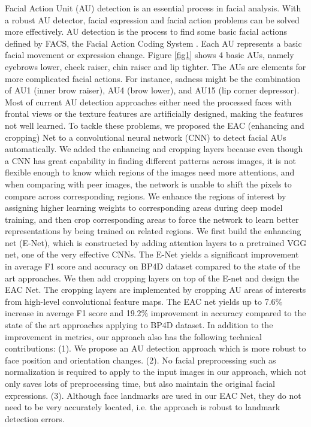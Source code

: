 \documentclass[a4paper, 10pt, conference]{ieeeconf}      %
\begin{document}
Facial Action Unit (AU) detection is an essential process in facial analysis. With a robust AU detector, facial expression and facial action problems can be solved more effectively. AU detection is the process to find some basic facial actions defined by FACS, the Facial Action Coding System \cite{p1}. Each AU represents a basic facial movement or expression change. Figure \ref{fig1} shows 4 basic AUs, namely eyebrows lower, cheek raiser, chin raiser and lip tighter.  The AUs are elements for more complicated facial actions. For instance, sadness might be the combination of AU1 (inner brow raiser), AU4 (brow lower), and AU15 (lip corner depressor). Most of current AU detection approaches either need the processed faces with frontal views or the texture features are artificially designed, making the features not well learned. To tackle these problems, we proposed the EAC (enhancing and cropping) Net to a convolutional neural network (CNN) to detect facial AUs automatically. { \color{black} We added the enhancing and cropping layers because even though a CNN has great capability in finding different patterns across images, it is not flexible enough to know which regions of the images need more attentions, and when comparing with peer images, the network is unable to shift the pixels to compare across corresponding regions. We enhance the regions of interest by assigning higher learning weights to corresponding areas during deep model training, and then crop corresponding areas to force the network to learn better representations by being trained on related regions.} We first build the enhancing net (E-Net), which is constructed by adding attention layers to a pretrained VGG net, one of the very effective CNNs. The E-Net yields a significant improvement in average F1 score and accuracy on BP4D dataset compared to the state of the art approaches. We then add cropping layers on top of the E-net and design the EAC Net. The cropping layers are implemented by cropping AU areas of interests from high-level convolutional feature maps. The EAC net yields up to 7.6\% increase in average F1 score and 19.2\% improvement in accuracy compared to the state of the art approaches applying to BP4D dataset. In addition to the improvement in metrics, our approach also has the following technical contributions:
(1).	We propose an AU detection approach which is more robust to face position and orientation changes.
(2).	No facial preprocessing such as normalization is required to apply to the input images in our approach, which not only saves lots of preprocessing time, but also maintain the original facial expressions.
(3).	Although face landmarks are used in our EAC Net, they do not need to be very accurately located, i.e. the approach is robust to landmark detection errors.
\end{document}
